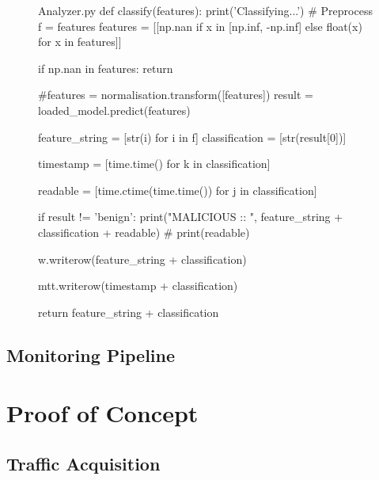 \lipsum[1-2]

\begin{figure}[h!]
    \begin{code}[colback=white]{Analyzer.py}
def classify(features):
print('Classifying...')
# Preprocess
f = features
features = [[np.nan if x in [np.inf, -np.inf]
                else float(x) for x in features]]

if np.nan in features:
    return

#features = normalisation.transform([features])
result = loaded_model.predict(features)

feature_string = [str(i) for i in f]
classification = [str(result[0])]

timestamp = [time.time() for k in classification]

readable = [time.ctime(time.time()) for j in classification]

if result != 'benign':
    print("MALICIOUS :: ", feature_string + classification + readable)
    # print(readable)

w.writerow(feature_string + classification)

mtt.writerow(timestamp + classification)

return feature_string + classification
\end{code}
\end{figure}


\subsection{Monitoring Pipeline}
\label{subsec:monitoring-pipeline}

\textcolor{dimgray}{\lipsum[1-2]}


\section{Proof of Concept}
\label{sec:poc}

\textcolor{dimgray}{\lipsum}


\subsection{Traffic Acquisition}
\label{subsec:traffic-acquisition}

